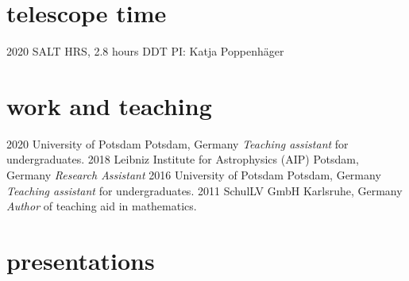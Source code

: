 \documentclass[]{k-cv} %
\begin{document}
\section{telescope time}

\begin{entrylist}
\entry
{2020 }
{SALT HRS, 2.8 hours DDT}
{}
{PI: Katja Poppenh\"ager}


\end{entrylist}

\section{work and teaching}

\begin{entrylist}

\entry
{2020}
{University of Potsdam}
{Potsdam, Germany}
{\emph{Teaching assistant} for undergraduates.}
\entry
{2018}
{Leibniz Institute for Astrophysics (AIP)}
{Potsdam, Germany}
{\emph{Research Assistant}}
\entry
{2016 }
{University of Potsdam}
{Potsdam, Germany}
{\emph{Teaching assistant} for undergraduates.}
\entry
{2011 }
{SchulLV GmbH}
{Karlsruhe, Germany}
{\emph{Author} of teaching aid in mathematics.}
\end{entrylist}


\newpage

\section{presentations}
\end{document}
